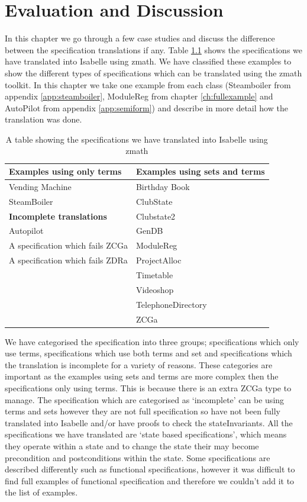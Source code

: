 \chapter{Evaluation and Discussion}
\label{ch:evaluation}

In this chapter we go through a few case studies and discuss the difference
between the specification translations if any. Table \ref{tab:specstranslated}
shows the specifications we have translated into Isabelle using \gls{zmath}. We
have classified these examples to show the different types of specifications
which can be translated using the \gls{zmath} toolkit. In this chapter we take
one example from each class (Steamboiler from appendix \ref{app:steamboiler}, ModuleReg from chapter \ref{ch:fullexample}
 and AutoPilot from appendix \ref{app:semiform}) 
and describe in more detail how the translation was done.

\begin{table}[H]
\begin{tabular}{|l|l|}
\hline
\textbf{Examples using only terms} & \textbf{Examples using sets and terms} \\
\hline
Vending Machine & Birthday Book \\
SteamBoiler & ClubState \\
\cline{1-1}
\cline{1-1}
\textbf{Incomplete translations} & Clubstate2 \\
\cline{1-1}
Autopilot & GenDB \\
A specification which fails ZCGa & ModuleReg \\
A specification which fails ZDRa & ProjectAlloc \\
& Timetable \\
& Videoshop \\
& TelephoneDirectory \\
& ZCGa \\
\hline
\end{tabular}
\caption{A table showing the specifications we have translated into Isabelle using \gls{zmath} \label{tab:specstranslated}}
\end{table}

We have categorised the specification into three groups; specifications which
only use terms, specifications which use both terms and set and specifications
which the translation is incomplete for a variety of reasons.
These categories are important as the examples using sets and terms are more complex
then the specifications only using terms. This is because there is an extra ZCGa type
to manage. The specification which are categorised as `incomplete' can be using terms
and sets however they are not full specification so have not been fully translated into 
Isabelle and/or have proofs to check the stateInvariants.
All the
specifications we have translated are `state based specifications', which means
they operate within a state and to change the state their may become
precondition and postconditions within the state. Some specifications are
described differently such as functional specifications, however 
it was difficult to find full examples of functional specification and therefore
we couldn't add it to the list of examples.


